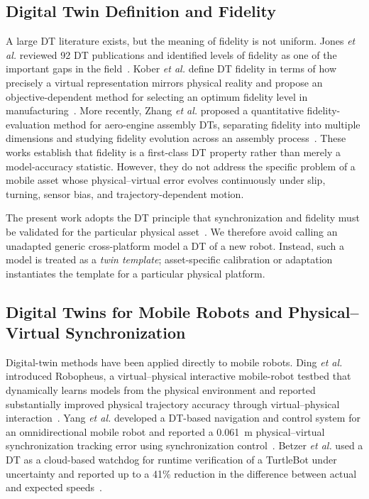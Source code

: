 \documentclass[conference]{IEEEtran}
\begin{document}
\subsection{Digital Twin Definition and Fidelity}
A large DT literature exists, but the meaning of fidelity is not uniform. Jones \emph{et al.} reviewed 92 DT publications and identified levels of fidelity as one of the important gaps in the field~\cite{jones2020dt}. Kober \emph{et al.} define DT fidelity in terms of how precisely a virtual representation mirrors physical reality and propose an objective-dependent method for selecting an optimum fidelity level in manufacturing~\cite{kober2023fidelity}. More recently, Zhang \emph{et al.} proposed a quantitative fidelity-evaluation method for aero-engine assembly DTs, separating fidelity into multiple dimensions and studying fidelity evolution across an assembly process~\cite{zhang2025fidelity}. These works establish that fidelity is a first-class DT property rather than merely a model-accuracy statistic. However, they do not address the specific problem of a mobile asset whose physical--virtual error evolves continuously under slip, turning, sensor bias, and trajectory-dependent motion.

The present work adopts the DT principle that synchronization and fidelity must be validated for the particular physical asset~\cite{dtc_definition}. We therefore avoid calling an unadapted generic cross-platform model a DT of a new robot. Instead, such a model is treated as a \emph{twin template}; asset-specific calibration or adaptation instantiates the template for a particular physical platform.

\subsection{Digital Twins for Mobile Robots and Physical--Virtual Synchronization}
Digital-twin methods have been applied directly to mobile robots. Ding \emph{et al.} introduced Robopheus, a virtual--physical interactive mobile-robot testbed that dynamically learns models from the physical environment and reported substantially improved physical trajectory accuracy through virtual--physical interaction~\cite{ding2021robopheus}. Yang \emph{et al.} developed a DT-based navigation and control system for an omnidirectional mobile robot and reported a 0.061~m physical--virtual synchronization tracking error using synchronization control~\cite{yang2025omr}. Betzer \emph{et al.} used a DT as a cloud-based watchdog for runtime verification of a TurtleBot under uncertainty and reported up to a 41\% reduction in the difference between actual and expected speeds~\cite{betzer2024runtime}.
\end{document}
